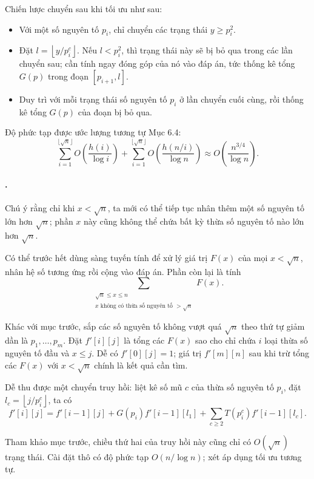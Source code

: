 \documentclass[11pt]{article}
\begin{document}
Chiến lược chuyển sau khi tối ưu như sau:
\begin{itemize}
  \item Với một số nguyên tố \(p_i\), chỉ chuyển các trạng thái \(y\ge p_i^2\).
  \item Đặt \(l=\left\lfloor y/p_i^c\right\rfloor\). Nếu \(l<p_i^2\), thì
  trạng thái này sẽ bị bỏ qua trong các lần chuyển sau; cần tính ngay đóng góp
  của nó vào đáp án, tức thống kê tổng \(G(p)\) trong đoạn \([p_{i+1},l]\).
  \item Duy trì với mỗi trạng thái số nguyên tố \(p_i\) ở lần chuyển cuối
  cùng, rồi thống kê tổng \(G(p)\) của đoạn bị bỏ qua.
\end{itemize}

Độ phức tạp được ước lượng tương tự Mục 6.4:
\[
  \sum_{i=1}^{\lfloor\sqrt n\rfloor}O\left(\frac{h(i)}{\log i}\right)
  +
  \sum_{i=1}^{\lfloor\sqrt n\rfloor}
  O\left(\frac{h(n/i)}{\log n}\right)
  \approx
  O\left(\frac{n^{3/4}}{\log n}\right).
\]

\paragraph{.}
Chú ý rằng chỉ khi \(x<\sqrt n\), ta mới có thể tiếp tục nhân thêm một số
nguyên tố lớn hơn \(\sqrt n\); phần \(x\) này cũng không thể chứa bất kỳ thừa
số nguyên tố nào lớn hơn \(\sqrt n\).

Có thể trước hết dùng sàng tuyến tính để xử lý giá trị \(F(x)\) của mọi
\(x<\sqrt n\), nhân hệ số tương ứng rồi cộng vào đáp án. Phần còn lại là tính
\[
  \sum_{\substack{\sqrt n\le x\le n\\
  x\text{ không có thừa số nguyên tố }>\sqrt n}}F(x).
\]

Khác với mục trước, sắp các số nguyên tố không vượt quá \(\sqrt n\) theo thứ
tự giảm dần là \(p_1,\ldots,p_m\). Đặt \(f'[i][j]\) là tổng các \(F(x)\) sao
cho chỉ chứa \(i\) loại thừa số nguyên tố đầu và \(x\le j\). Dễ có
\(f'[0][j]=1\); giá trị \(f'[m][n]\) sau khi trừ tổng các \(F(x)\) với
\(x<\sqrt n\) chính là kết quả cần tìm.

Dễ thu được một chuyển truy hồi: liệt kê số mũ \(c\) của thừa số nguyên tố
\(p_i\), đặt \(l_c=\left\lfloor j/p_i^c\right\rfloor\), ta có
\[
  f'[i][j]
  =
  f'[i-1][j]
  +G(p_i)f'[i-1][l_1]
  +\sum_{c\ge2}T(p_i^c)f'[i-1][l_c].
\]

Tham khảo mục trước, chiều thứ hai của truy hồi này cũng chỉ có \(O(\sqrt n)\)
trạng thái. Cài đặt thô có độ phức tạp \(O(n/\log n)\); xét áp dụng tối ưu
tương tự.
\end{document}
